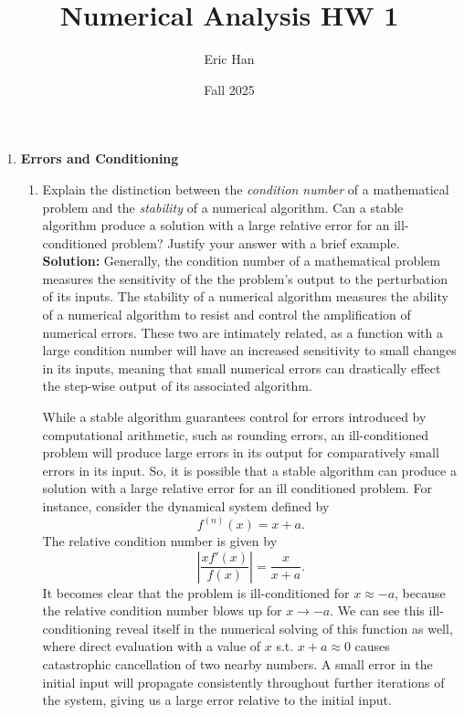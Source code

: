 \documentclass{article}
\title{Numerical Analysis HW 1}
\author{Eric Han}
\date{Fall 2025}
\theoremstyle{definition}
\theoremstyle{remark}
\begin{document}
\maketitle

\begin{enumerate} 
\item \textbf{Errors and Conditioning}
    \begin{enumerate}
        \item Explain the distinction between the \textit{condition number} of a mathematical problem and the \textit{stability} of a numerical algorithm. Can a stable algorithm produce a solution with a large relative error for an ill-conditioned problem? Justify your answer with a brief example.\\

        \textbf{Solution:} Generally, the condition number of a mathematical problem measures the sensitivity of the the problem's output to the perturbation of its inputs. The stability of a numerical algorithm measures the ability of a numerical algorithm to resist and control the amplification of numerical errors. These two are intimately related, as a function with a large condition number will have an increased sensitivity to small changes in its inputs, meaning that small numerical errors can drastically effect the step-wise output of its associated algorithm. 

        While a stable algorithm guarantees control for errors introduced by computational arithmetic, such as rounding errors, an ill-conditioned problem will produce large errors in its output for comparatively small errors in its input. So, it is possible that a stable algorithm can produce a solution with a large relative error for an ill conditioned problem. For instance, consider the dynamical system defined by
        \[
            f^{(n)}(x) = x+a
        .\]
        The relative condition number is given by
        \[
            \left| \frac{xf'(x)}{f(x)} \right| = \frac{x}{x+a}
        .\]
        It becomes clear that the problem is ill-conditioned for \(x \approx -a\), because the relative condition number blows up for \(x \to -a\). We can see this ill-conditioning reveal itself in the numerical solving of this function as well, where direct evaluation with a value of \(x\) s.t. \(x+a \approx 0\) causes catastrophic cancellation of two nearby numbers. A small error in the initial input will propagate consistently throughout further iterations of the system, giving us a large error relative to the initial input.\\


\end{enumerate}
\end{enumerate}
\end{document}

